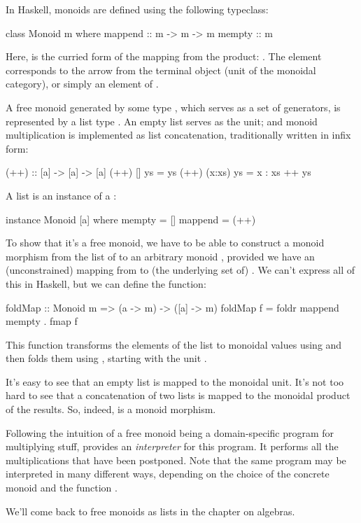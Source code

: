 \documentclass[DaoFP]{subfiles}
\begin{document}
In Haskell, monoids are defined using the following typeclass:
\begin{haskell}
class Monoid m where
  mappend :: m -> m -> m
  mempty  :: m
\end{haskell}
Here,  is the curried form of the mapping from the product: . The  element corresponds to the arrow from the terminal object (unit of the monoidal category), or simply an element of . 

A free monoid generated by some type , which serves as a set of generators, is represented by a list type \hask{[a]}. An empty list serves as the unit; and monoid multiplication is implemented as list concatenation, traditionally written in infix form:
\begin{haskell}
(++) :: [a] -> [a] -> [a]
(++) []     ys = ys
(++) (x:xs) ys = x : xs ++ ys
\end{haskell}
A list is an instance of a :
\begin{haskell}
instance Monoid [a] where
  mempty = []
  mappend = (++)
\end{haskell}

To show that it's a free monoid, we have to be able to construct a monoid morphism from the list of  to an arbitrary monoid , provided we have an (unconstrained) mapping from  to (the underlying set of) . We can't express all of this in Haskell, but we can define the function:
\begin{haskell}
foldMap :: Monoid m => (a -> m) -> ([a] -> m)
foldMap f = foldr mappend mempty . fmap f
\end{haskell}
This function transforms the elements of the list to monoidal values using  and then folds them using , starting with the unit . 

It's easy to see that an empty list is mapped to the monoidal unit. It's not too hard to see that a concatenation of two lists is mapped to the monoidal product of the results. So, indeed,  is a monoid morphism. 

Following the intuition of a free monoid being a domain-specific program for multiplying stuff,  provides an \emph{interpreter} for this program. It performs all the multiplications that have been postponed. Note that the same program may be interpreted in many different ways, depending on the choice of the concrete monoid and the function .

We'll come back to free monoids as lists in the chapter on algebras.
\end{document}
